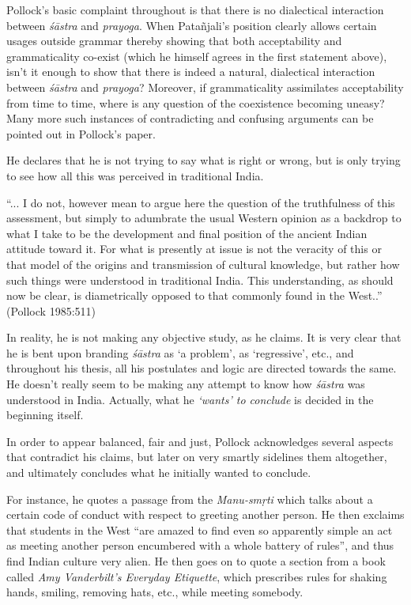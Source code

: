 Pollock's basic complaint throughout is that there is no dialectical interaction between {\it śāstra} and {\it prayoga}. When Patañjali’s position clearly allows certain usages outside grammar thereby showing that both acceptability and grammaticality co-exist (which he himself agrees in the first statement above), isn't it enough to show that there is indeed a natural, dialectical interaction between {\it śāstra} and {\it prayoga}? Moreover, if grammaticality assimilates acceptability from time to time, where is any question of the coexistence becoming uneasy? Many more such instances of contradicting and confusing arguments can be pointed out in Pollock's paper.

He declares that he is not trying to say what is right or wrong, but is only trying to see how all this was perceived in traditional India. 
\begin{myquote}
``... I do not, however mean to argue here the question of the truthfulness of this assessment, but simply to adumbrate the usual Western opinion as a backdrop to what I take to be the development and final position of the ancient Indian attitude toward it. For what is presently at issue is not the veracity of this or that model of the origins and transmission of cultural knowledge, but rather how such things were understood in traditional India. This understanding, as should now be clear, is diametrically opposed to that commonly found in the West..'' \hfill (Pollock 1985:511)
\end{myquote}

In reality, he is not making any objective study, as he claims. It is very clear that he is bent upon branding {\it śāstra} as `a problem', as `regressive', etc., and throughout his thesis, all his postulates  and logic are directed towards the same. He doesn't really seem to be making any attempt to know how {\it śāstra} was understood in India. Actually, what he \textsl{`wants' to conclude} is decided in the beginning itself. 

In order to appear balanced, fair and just, Pollock acknowledges several aspects that contradict his claims, but later on very smartly sidelines them altogether, and ultimately concludes what he initially wanted to conclude. 

For instance, he quotes a passage from the {\it Manu-smṛti} which talks about a certain code of conduct with respect to greeting another person. He then exclaims that students in the West ``are amazed to find even so apparently simple an act as meeting another person encumbered with a whole battery of rules'', and thus find Indian culture very alien. He then goes on to quote a section from a book called \textsl{Amy Vanderbilt’s Everyday Etiquette}, which prescribes rules for shaking hands, smiling, removing hats, etc., while meeting somebody. 

